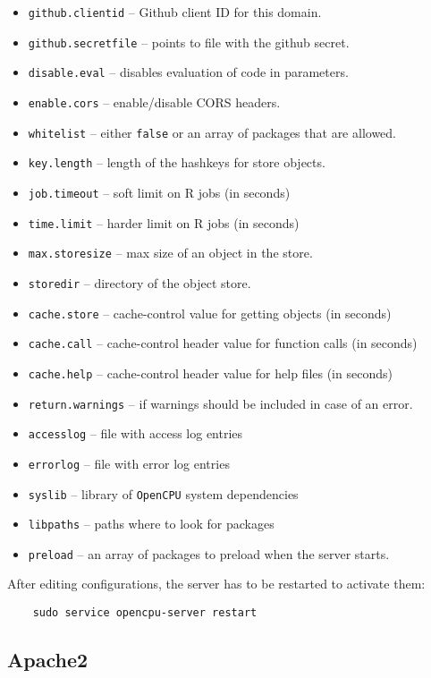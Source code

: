 \documentclass{scrartcl}
\begin{document}
\begin{itemize}
   \item \texttt{github.clientid} -- Github client ID for this domain.
   \item \texttt{github.secretfile} -- points to file with the github secret.
   \item \texttt{disable.eval} -- disables evaluation of code in parameters.
   \item \texttt{enable.cors} -- enable/disable CORS headers.
   \item \texttt{whitelist} -- either \texttt{false} or an array of packages
   that are allowed.
   \item \texttt{key.length} -- length of the hashkeys for store objects.
   \item \texttt{job.timeout} -- soft limit on R jobs (in seconds)
   \item \texttt{time.limit} -- harder limit on R jobs (in seconds)
   \item \texttt{max.storesize} -- max size of an object in the store.
   \item \texttt{storedir} -- directory of the object store.
   \item \texttt{cache.store} -- cache-control value for getting objects (in
   seconds)
   \item \texttt{cache.call} -- cache-control header value for function calls
   (in seconds)
   \item \texttt{cache.help} -- cache-control header value for help files (in
   seconds)
   \item \texttt{return.warnings} -- if warnings should be included in case of
   an error.
   \item \texttt{accesslog} -- file with access log entries
   \item \texttt{errorlog} -- file with error log entries
   \item \texttt{syslib} -- library of \texttt{OpenCPU} system dependencies
   \item \texttt{libpaths} -- paths where to look for packages
   \item \texttt{preload} -- an array of packages to preload when the server
   starts.
\end{itemize}
After editing configurations, the server has to be restarted to activate them:
\begin{verbatim}
    sudo service opencpu-server restart
\end{verbatim}

\subsection{Apache2}
\end{document}
